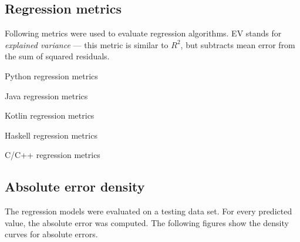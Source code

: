 \documentclass[digital,oneside,oldtable,nolof,nolot,nocover]{fithesis4}
\begin{document}
\FloatBarrier
\subsection*{Regression metrics}
\label{sec:org1822a06}
Following metrics were used to evaluate regression algorithms. EV stands for \emph{explained variance}
--- this metric is similar to \(R^2\), but subtracts mean error from the sum of squared residuals.
\begin{table}[H]
\caption{Python regression metrics}
\centering
\begingroup\scriptsize

\endgroup
\end{table}

\begin{table}[H]
\caption{Java regression metrics}
\centering
\begingroup\scriptsize

\endgroup
\end{table}

\begin{table}[H]
\caption{Kotlin regression metrics}
\centering
\begingroup\scriptsize

\endgroup
\end{table}

\begin{table}[H]
\caption{Haskell regression metrics}
\centering
\begingroup\scriptsize

\endgroup
\end{table}

\begin{table}[H]
\caption{C/C++ regression metrics}
\centering
\begingroup\scriptsize

\endgroup
\end{table}

\FloatBarrier
\subsection*{Absolute error density}
\label{sec:org13e25bd}
The regression models were evaluated on a testing data set. For every predicted value, the absolute error was computed.
The following figures show the density curves for absolute errors.
\FloatBarrier

\restoregeometry

\pagestyle{headings}
\thispagestyle{plain}
\end{document}

